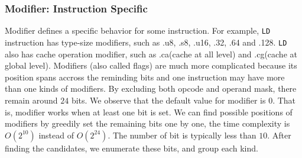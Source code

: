 \subsubsection{Modifier: Instruction Specific}

Modifier defines a specific behavior for some instruction. For example,
{\tt LD} instruction has type-size modifiers, such as .u8, .s8, .u16, .32, .64 and .128. {\tt LD} also has cache operation modifier, such as .ca(cache at all level) and .cg(cache at global level). Modifiers (also called flags) are much more complicated because its position spans accross the reminding bits and one instruction may have more than one kinds of modifiers. By excluding both opcode and operand mask, there remain around $24$ bits. We observe that the default value for modifier is $0$. That is, modifier works when at least one bit is set. We can find possible positions of modifiers 
by greedily set the remaining bits one by one, the time complexity is $O(2^{10})$ instead of $O(2^{24})$. The number of bit is typically less
than $10$. After finding the candidates, we enumerate these bits, and group each kind.


